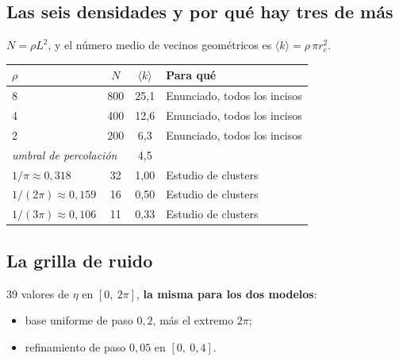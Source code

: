 \documentclass[11pt]{article}
\begin{document}
\subsection{Las seis densidades y por qué hay tres de más}

$N = \rho L^2$, y el número medio de vecinos geométricos es
$\langle k \rangle = \rho\,\pi r_c^2$.

\begin{center}
\begin{tabular}{lccl}
\toprule
$\rho$ & $N$ & $\langle k \rangle$ & Para qué \\
\midrule
8                   & 800 & 25{,}1 & Enunciado, todos los incisos \\
4                   & 400 & 12{,}6 & Enunciado, todos los incisos \\
2                   & 200 & \phantom{0}6{,}3 & Enunciado, todos los incisos \\
\midrule
\multicolumn{2}{l}{\emph{umbral de percolación}} & \phantom{0}4{,}5 & \\
\midrule
$1/\pi \approx 0{,}318$    & 32 & 1{,}00 & Estudio de clusters \\
$1/(2\pi) \approx 0{,}159$ & 16 & 0{,}50 & Estudio de clusters \\
$1/(3\pi) \approx 0{,}106$ & 11 & 0{,}33 & Estudio de clusters \\
\bottomrule
\end{tabular}
\end{center}


\subsection{La grilla de ruido}

39 valores de $\eta$ en $[0,\ 2\pi]$, \textbf{la misma para los dos modelos}:

\begin{itemize}
  \item base uniforme de paso $0{,}2$, más el extremo $2\pi$;
  \item refinamiento de paso $0{,}05$ en $[0,\ 0{,}4]$.
\end{itemize}
\end{document}
